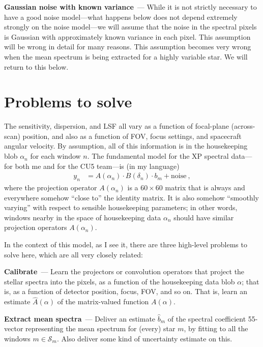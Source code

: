 \documentclass[11pt]{article}
\renewcommand{\paragraph}[1]{\medskip\par\noindent\textbf{#1}~---}
\begin{document}
\paragraph{Gaussian noise with known variance}
While it is not strictly necessary to have a good noise model---what happens below does not depend extremely strongly on the noise model---we will assume that the noise in the spectral pixels is Gaussian with approximately known variance in each pixel.
This assumption will be wrong in detail for many reasons.
This assumption becomes very wrong when the mean spectrum is being extracted for a highly variable star.
We will return to this below.

\section{Problems to solve}

The sensitivity, dispersion, and LSF all vary as a function of focal-plane (across-scan) position, and also as a function of FOV, focus settings, and spacecraft angular velocity.
By assumption, all of this information is in the housekeeping blob $\alpha_n$ for each window $n$.
The fundamental model for the XP spectral data---for both me and for the CU5 team---is (in my language)
\begin{align}
    y_n &= A(\alpha_n)\cdot B(\delta_n)\cdot b_m + \mbox{noise} ~,\label{eq:A}
\end{align}
where the projection operator $A(\alpha_n)$ is a $60\times 60$ matrix that is always and everywhere somehow ``close to'' the identity matrix.
It is also somehow ``smoothly varying'' with respect to sensible housekeeping parameters; in other words, windows nearby in the space of housekeeping data $\alpha_n$ should have similar projection operators $A(\alpha_n)$.

In the context of this model, as I see it, there are three high-level problems to solve here, which are all very closely related:

\paragraph{Calibrate}
Learn the projectors or convolution operators that project the stellar spectra into the pixels, as a function of the housekeeping data blob $\alpha$; that is, as a function of detector position, focus, FOV, and so on.
That is, learn an estimate $\hat{A}(\alpha)$ of the matrix-valued function $A(\alpha)$.

\paragraph{Extract mean spectra}
Deliver an estimate $\hat{b}_m$ of the spectral coefficient 55-vector representing the mean spectrum for (every) star $m$, by fitting to all the windows $m\in\mathscr{S}_m$. Also deliver some kind of uncertainty estimate on this.
\end{document}
